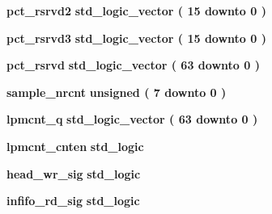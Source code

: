 \begin{DoxyCompactItemize}
\item 
{\bf pct\+\_\+rsrvd2} {\bfseries \textcolor{comment}{std\+\_\+logic\+\_\+vector}\textcolor{vhdlchar}{ }\textcolor{vhdlchar}{(}\textcolor{vhdlchar}{ }\textcolor{vhdlchar}{ } \textcolor{vhdldigit}{15} \textcolor{vhdlchar}{ }\textcolor{keywordflow}{downto}\textcolor{vhdlchar}{ }\textcolor{vhdlchar}{ } \textcolor{vhdldigit}{0} \textcolor{vhdlchar}{ }\textcolor{vhdlchar}{)}\textcolor{vhdlchar}{ }} 
\item 
{\bf pct\+\_\+rsrvd3} {\bfseries \textcolor{comment}{std\+\_\+logic\+\_\+vector}\textcolor{vhdlchar}{ }\textcolor{vhdlchar}{(}\textcolor{vhdlchar}{ }\textcolor{vhdlchar}{ } \textcolor{vhdldigit}{15} \textcolor{vhdlchar}{ }\textcolor{keywordflow}{downto}\textcolor{vhdlchar}{ }\textcolor{vhdlchar}{ } \textcolor{vhdldigit}{0} \textcolor{vhdlchar}{ }\textcolor{vhdlchar}{)}\textcolor{vhdlchar}{ }} 
\item 
{\bf pct\+\_\+rsrvd} {\bfseries \textcolor{comment}{std\+\_\+logic\+\_\+vector}\textcolor{vhdlchar}{ }\textcolor{vhdlchar}{(}\textcolor{vhdlchar}{ }\textcolor{vhdlchar}{ } \textcolor{vhdldigit}{63} \textcolor{vhdlchar}{ }\textcolor{keywordflow}{downto}\textcolor{vhdlchar}{ }\textcolor{vhdlchar}{ } \textcolor{vhdldigit}{0} \textcolor{vhdlchar}{ }\textcolor{vhdlchar}{)}\textcolor{vhdlchar}{ }} 
\item 
{\bf sample\+\_\+nrcnt} {\bfseries \textcolor{comment}{unsigned}\textcolor{vhdlchar}{ }\textcolor{vhdlchar}{(}\textcolor{vhdlchar}{ }\textcolor{vhdlchar}{ } \textcolor{vhdldigit}{7} \textcolor{vhdlchar}{ }\textcolor{keywordflow}{downto}\textcolor{vhdlchar}{ }\textcolor{vhdlchar}{ } \textcolor{vhdldigit}{0} \textcolor{vhdlchar}{ }\textcolor{vhdlchar}{)}\textcolor{vhdlchar}{ }} 
\item 
{\bf lpmcnt\+\_\+q} {\bfseries \textcolor{comment}{std\+\_\+logic\+\_\+vector}\textcolor{vhdlchar}{ }\textcolor{vhdlchar}{(}\textcolor{vhdlchar}{ }\textcolor{vhdlchar}{ } \textcolor{vhdldigit}{63} \textcolor{vhdlchar}{ }\textcolor{keywordflow}{downto}\textcolor{vhdlchar}{ }\textcolor{vhdlchar}{ } \textcolor{vhdldigit}{0} \textcolor{vhdlchar}{ }\textcolor{vhdlchar}{)}\textcolor{vhdlchar}{ }} 
\item 
{\bf lpmcnt\+\_\+cnten} {\bfseries \textcolor{comment}{std\+\_\+logic}\textcolor{vhdlchar}{ }} 
\item 
{\bf head\+\_\+wr\+\_\+sig} {\bfseries \textcolor{comment}{std\+\_\+logic}\textcolor{vhdlchar}{ }} 
\item 
{\bf infifo\+\_\+rd\+\_\+sig} {\bfseries \textcolor{comment}{std\+\_\+logic}\textcolor{vhdlchar}{ }} 

\end{DoxyCompactItemize}
